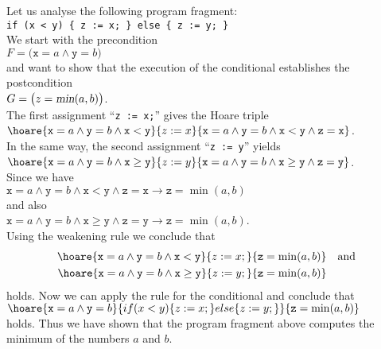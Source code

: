 \example
Let us analyse the following program fragment:
\\[0.2cm]
\hspace*{1.3cm}
\texttt{if (x < y) \{ z := x; \} else \{ z := y; \}}
\\[0.2cm]
We start with the precondition
\\[0.2cm]
\hspace*{1.3cm}
$F = \bigl(\texttt{x} = a \wedge \texttt{y} = b\bigr)$
\\[0.2cm]
and want to show that the execution of the conditional establishes the postcondition
\\[0.2cm]
\hspace*{1.3cm}
$G = \bigl(z = \textsl{min}(a, b)\bigr)$.
\\[0.2cm]
The first assignment ``\texttt{z := x;}'' gives the Hoare triple 
\\[0.2cm]
\hspace*{1.3cm}
$\hoare{\texttt{x} = a \wedge \texttt{y} = b \wedge \texttt{x} < \texttt{y}}{z := x}{
          \texttt{x} = a \wedge \texttt{y} = b \wedge \texttt{x} < \texttt{y} \wedge \texttt{z} = \texttt{x}}
$.
\\[0.2cm]
In the same way, the second assignment ``\texttt{z := y}'' yields
\\[0.2cm]
\hspace*{1.3cm}
$\hoare{\texttt{x} = a \wedge \texttt{y} = b \wedge \texttt{x} \geq \texttt{y}}{z := y}{
          \texttt{x} = a \wedge \texttt{y} = b \wedge \texttt{x} \geq \texttt{y} \wedge
          \texttt{z} = \texttt{y}}$.
\\[0.2cm]
Since we have
\\[0.2cm]
\hspace*{1.3cm}
$\texttt{x} = a \wedge \texttt{y} = b \wedge \texttt{x} < \texttt{y} \wedge \texttt{z} = \texttt{x}
   \rightarrow \texttt{z} = \min(a,b)$
\\[0.2cm]
and also
\\[0.2cm]
\hspace*{1.3cm}
$ \texttt{x} = a \wedge \texttt{y} = b \wedge \texttt{x} \geq \texttt{y} \wedge \texttt{z} = \texttt{y} 
   \rightarrow \texttt{z} = \min(a,b)
$.
\\[0.2cm]
Using the weakening rule we conclude that 
\begin{eqnarray*}
\hoare{\texttt{x} = a \wedge \texttt{y} = b \wedge \texttt{x} < \texttt{y}}{z := x;}{
       \texttt{z} = \min(a,b)} & & \mathrm{and} \\
\hoare{\texttt{x} = a \wedge \texttt{y} = b \wedge \texttt{x} \geq \texttt{y}}{z := y;}{
          \texttt{z} = \min(a,b)}
\end{eqnarray*}
holds.  Now we can apply the rule for the conditional and conclude
that 
\\[0.2cm]
$ \hoare{\texttt{x} = a \wedge \texttt{y} = b}{if (x < y) \{ z := x; \} else \{ z := y; \}}{ \texttt{z} = \min(a,b)} $
\\[0.2cm]
holds.  Thus we have shown that the program fragment above computes
the minimum of the numbers $a$ and $b$.

